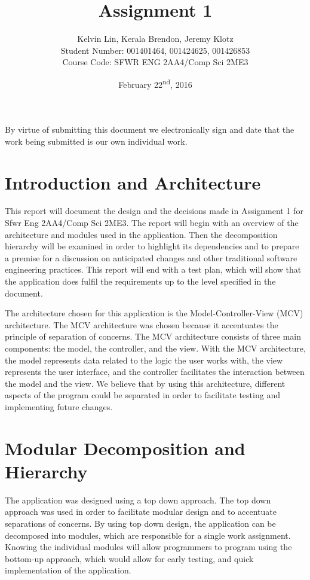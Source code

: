 \documentclass{article}
\title{Assignment 1}
\author{Kelvin Lin, Kerala Brendon, Jeremy Klotz\\Student Number: 001401464, 001424625, 001426853\\Course Code: SFWR ENG 2AA4/Comp Sci 2ME3}
\date{February 22\textsuperscript{nd}, 2016}
\begin{document}
\begin{titlepage}
\maketitle
\center By virtue of submitting this document we electronically sign and date that the work being submitted is our own individual work.
\end{titlepage}

\tableofcontents
\newpage

\section{Introduction and Architecture}
This report will document the design and the decisions made in Assignment 1 for Sfwr Eng 2AA4/Comp Sci 2ME3. The report will begin with an overview of the architecture and modules used in the application. Then the decomposition hierarchy will be examined in order to highlight its dependencies and to prepare a premise for a discussion on anticipated changes and other traditional software engineering practices. This report will end with a test plan, which will show that the application does fulfil the requirements up to the level specified in the document.

The architecture chosen for this application is the Model-Controller-View (MCV) architecture. The MCV architecture was chosen because it accentuates the principle of separation of concerns. The MCV architecture consists of three main components: the model, the controller, and the view. With the MCV architecture, the model represents data related to the logic the user works with, the view represents the user interface, and the controller facilitates the interaction between the model and the view. We believe that by using this architecture, different aspects of the program could be separated in order to facilitate testing and implementing future changes.

\section{Modular Decomposition and Hierarchy}
The application was designed using a top down approach. The top down approach was used in order to facilitate modular design and to accentuate separations of concerns. By using top down design, the application can be decomposed into modules, which are responsible for a single work assignment. Knowing the individual modules will allow programmers to program using the bottom-up approach, which would allow for early testing, and quick implementation of the application.
\end{document}
